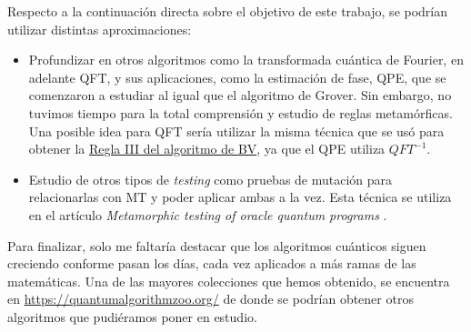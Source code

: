 \newpage
Respecto a la continuación directa sobre el objetivo de este trabajo, se podrían utilizar distintas aproximaciones:

\begin{itemize}
    \item Profundizar en otros algoritmos como la transformada cuántica de Fourier, en adelante QFT, y sus aplicaciones, como la estimación de fase, QPE, que se comenzaron a estudiar al igual que el algoritmo de Grover. Sin embargo, no tuvimos tiempo para la total comprensión y estudio de reglas metamórficas. Una posible idea para QFT sería utilizar la misma técnica que se usó para obtener la \hyperref[RIII:BV]{Regla III del algoritmo de BV}, ya que el QPE utiliza $QFT^{-1}$.

    \item Estudio de otros tipos de \textit{testing} como pruebas de mutación para relacionarlas con MT y poder aplicar ambas a la vez. Esta técnica se  utiliza en el artículo \textit{Metamorphic testing of oracle quantum programs} \cite{metamorphicAdd:2022}.
\end{itemize}

Para finalizar, solo me faltaría destacar que los algoritmos cuánticos siguen creciendo conforme pasan los días, cada vez aplicados a más ramas de las matemáticas. Una de las mayores colecciones que hemos obtenido, se encuentra en \url{https://quantumalgorithmzoo.org/} de donde se podrían obtener otros algoritmos que pudiéramos poner en estudio.